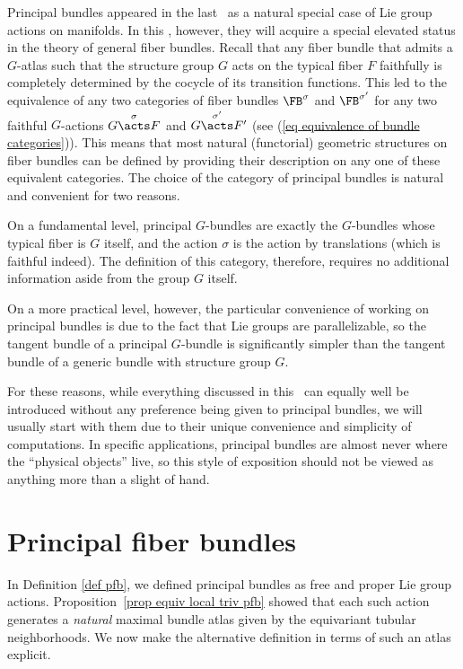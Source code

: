     Principal bundles appeared in the last \chap\ as a natural special case of Lie group actions on manifolds. In this \chap, however, they will acquire a special elevated status in the theory of general fiber bundles. Recall that any fiber bundle that admits a $G$-atlas such that the structure group $G$ acts on the typical fiber $F$ faithfully is completely determined by the cocycle of its transition functions. This led to the equivalence of any two categories of fiber bundles $\FB^\sigma$ and $\FB^{\sigma'}$ for any two faithful $G$-actions $G\overset{\sigma}{\acts}F$ and $G\overset{\sigma'}{\acts}F'$ (see (\ref{eq equivalence of bundle categories})). This means that most natural (functorial) geometric structures on fiber bundles can be defined by providing their description on any one of these equivalent categories. The choice of the category of principal bundles is natural and convenient for two reasons. 
    
    On a fundamental level, principal $G$-bundles are exactly the $G$-bundles whose typical fiber is $G$ itself, and the action $\sigma$ is the action by translations (which is faithful indeed). The definition of this category, therefore, requires no additional information aside from the group $G$ itself. 
    
    On a more practical level, however, the particular convenience of working on principal bundles is due to the fact that Lie groups are parallelizable, so the tangent bundle of a principal $G$-bundle is significantly simpler than the tangent bundle of a generic bundle with structure group $G$. 

    For these reasons, while everything discussed in this \chap\ can equally well be introduced without any preference being given to principal bundles, we will usually start with them due to their unique convenience and simplicity of computations. In specific applications, principal bundles are almost never where the ``physical objects'' live, so this style of exposition should not be viewed as anything more than a slight of hand.



\section{Principal fiber bundles}\label{sec: principal bundles}


In Definition \ref{def pfb}, we defined principal bundles as free and proper Lie group actions. Proposition~\ref{prop equiv local triv pfb} showed that each such action generates a \emph{natural} maximal bundle atlas given by the equivariant tubular neighborhoods. We now make the alternative definition in terms of such an atlas explicit.

